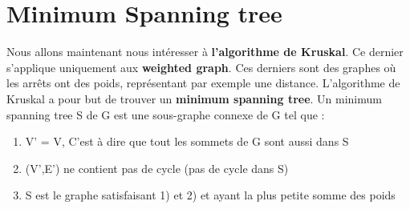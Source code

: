 \newpage

\section{Minimum Spanning tree}
    Nous allons maintenant nous intéresser à \textbf{l'algorithme de Kruskal}. Ce dernier s'applique uniquement aux \textbf{weighted graph}. Ces derniers sont des graphes où les arrêts ont des poids, représentant par exemple une distance. L'algorithme de Kruskal a pour but de trouver un \textbf{minimum spanning tree}. Un minimum spanning tree S de G est une sous-graphe connexe de G tel que :
    \begin{enumerate}
        \item V' = V, C'est à dire que tout les sommets de G sont aussi dans S
        \item (V',E') ne contient pas de cycle (pas de cycle dans S)
        \item S est le graphe satisfaisant 1) et 2) et ayant la plus petite somme des poids
    \end{enumerate}
    
    \textbf{\\}
    
